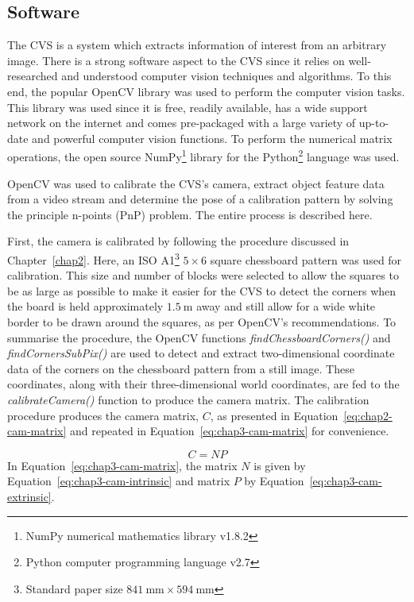 \subsection{Software}
\label{sec:cv-sys-software}

The CVS is a system which extracts information of interest from an arbitrary image. There is a strong software aspect to the CVS since it relies on well-researched and understood computer vision techniques and algorithms. To this end, the popular OpenCV library was used to perform the computer vision tasks. This library was used since it is free, readily available, has a wide support network on the internet and comes pre-packaged with a large variety of up-to-date and powerful computer vision functions. To perform the numerical matrix operations, the open source NumPy\footnote{NumPy numerical mathematics library v1.8.2} library for the Python\footnote{Python computer programming language v2.7} language was used. 

OpenCV was used to calibrate the CVS's camera, extract object feature data from a video stream and determine the pose of a calibration pattern by solving the principle n-points (PnP) problem. The entire process is described here. 

First, the camera is calibrated by following the procedure discussed in Chapter~\ref{chap2}. Here, an ISO A1\footnote{Standard paper size $\SI{841}{\mm}\times\SI{594}{\mm}$} $5\times6$ square chessboard pattern was used for calibration. This size and number of blocks were selected to allow the squares to be as large as possible to make it easier for the CVS to detect the corners when the board is held approximately $\SI{1.5}{\m}$ away and still allow for a wide white border to be drawn around the squares, as per OpenCV's recommendations. To summarise the procedure, the OpenCV functions \emph{findChessboardCorners()} and \emph{findCornersSubPix()} are used to detect and extract two-dimensional coordinate data of the corners on the chessboard pattern from a still image. These coordinates, along with their three-dimensional world coordinates, are fed to the \emph{calibrateCamera()} function to produce the camera matrix. The calibration procedure produces the camera matrix, $C$, as presented in Equation~\ref{eq:chap2-cam-matrix} and repeated in Equation~\ref{eq:chap3-cam-matrix} for convenience. 

\begin{equation}
  \label{eq:chap3-cam-matrix}
  C = 
  NP
\end{equation}
In Equation~\ref{eq:chap3-cam-matrix}, the matrix $N$ is given by Equation~\ref{eq:chap3-cam-intrinsic} and matrix $P$ by Equation~\ref{eq:chap3-cam-extrinsic}.

